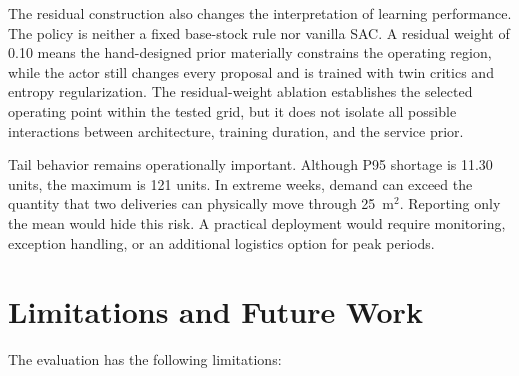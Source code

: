 \documentclass[pdflatex,sn-mathphys-num]{sn-jnl}
\begin{document}
The residual construction also changes the interpretation of learning performance. The policy is neither a fixed base-stock rule nor vanilla SAC. A residual weight of 0.10 means the hand-designed prior materially constrains the operating region, while the actor still changes every proposal and is trained with twin critics and entropy regularization. The residual-weight ablation establishes the selected operating point within the tested grid, but it does not isolate all possible interactions between architecture, training duration, and the service prior.

Tail behavior remains operationally important. Although P95 shortage is 11.30 units, the maximum is 121 units. In extreme weeks, demand can exceed the quantity that two deliveries can physically move through 25~m$^2$. Reporting only the mean would hide this risk. A practical deployment would require monitoring, exception handling, or an additional logistics option for peak periods.

\section{Limitations and Future Work}\label{sec:limitations}

The evaluation has the following limitations:
\end{document}
